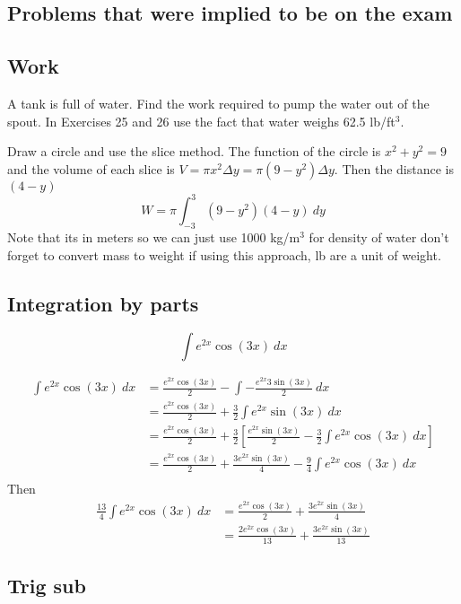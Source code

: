 \documentclass{article}
\begin{document}
\pagebreak
\begin{multicols}{2}
\section*{Problems that were implied to be on the exam}
\subsection*{Work}
A tank is full of water. Find the work required to pump the water out of the spout. In Exercises 25 and 26 use the fact that water weighs 62.5 lb/ft$^3$.

Draw a circle and use the slice method. The function of the circle is $x^2 + y^2 = 9$ and the volume of each slice is $V = \pi x^2 \Delta y = \pi (9-y^2) \Delta y$. Then the distance is $(4-y)$
\[
	W = \pi \int_{-3}^3 (9-y^2)(4-y)\ dy
\]
Note that its in meters so we can just use 1000 kg/m$^3$ for density of water don't forget to convert mass to weight if using this approach, lb are a unit of weight.

\subsection*{Integration by parts}
\[
	\int e^{2x} \cos(3x)\ dx
\]

\begin{align*}
	\int e^{2x} \cos(3x)\ dx &= \frac{e^{2x} \cos(3x)}{2} - \int -\frac{e^{2x} 3 \sin(3x)}{2}\ dx \\
				 &= \frac{e^{2x} \cos(3x)}{2} + \frac{3}{2}\int e^{2x} \sin(3x)\ dx \\
				 &= \frac{e^{2x} \cos(3x)}{2} + \frac{3}{2}\left[\frac{e^{2x} \sin(3x)}{2} - \frac{3}{2}\int e^{2x} \cos(3x)\ dx \right] \\
				 &= \frac{e^{2x} \cos(3x)}{2} + \frac{3e^{2x} \sin(3x)}{4} - \frac{9}{4}\int e^{2x} \cos(3x)\ dx \\
\end{align*}
Then
\begin{align*}
	\frac{13}{4} \int e^{2x} \cos(3x)\ dx &= \frac{e^{2x} \cos(3x)}{2} + \frac{3e^{2x} \sin(3x)}{4} \\
					      &= \boxed{\frac{2e^{2x} \cos(3x)}{13} + \frac{3e^{2x} \sin(3x)}{13}}
\end{align*}

\subsection*{Trig sub}


\end{multicols}
\end{document}
